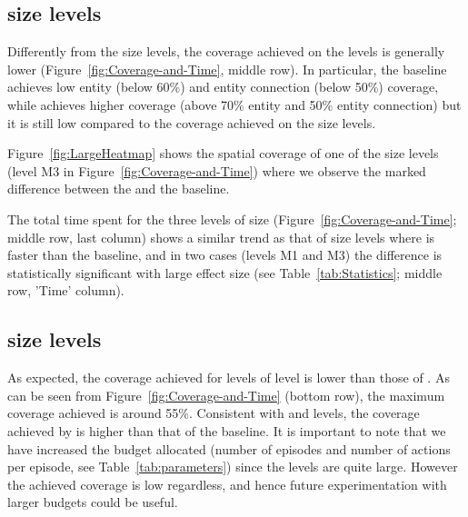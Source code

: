 \subsection{\lrg size levels}
Differently from the \med size levels, the coverage achieved on the \lrg levels is generally lower (Figure~\ref{fig:Coverage-and-Time}, middle row). In particular, the baseline achieves low entity (below 60\%) and entity connection (below 50\%) coverage, while \approach achieves higher coverage (above 70\% entity and 50\% entity connection) but it is still low compared to the coverage achieved on the \med size levels.

Figure~\ref{fig:LargeHeatmap} shows the spatial coverage of one of the \lrg size levels (level M3 in Figure~\ref{fig:Coverage-and-Time}) where we observe the marked difference between the \approach and the baseline.

The total time spent for the three levels of \lrg size (Figure~\ref{fig:Coverage-and-Time}; middle row, last column) shows a similar trend as that of \med size levels where \approach is faster than the baseline, and in two cases (levels M1 and M3) the difference is statistically significant with large effect size (see Table~\ref{tab:Statistics}; middle row, 'Time' column). 

\begin{figure*}[!htb]
	\hspace*{\fill}%
	\hfill%
	\hspace*{\fill}%
	\caption{Spatial coverage for level M3 of \lrg size. The darker the color the less explored the area.}
	\label{fig:LargeHeatmap}
\end{figure*}

\subsection{\ext size levels}
As expected, the coverage achieved for levels of \ext level is lower than those of \med. As can be seen from Figure~\ref{fig:Coverage-and-Time} (bottom row), the maximum coverage achieved is around 55\%. Consistent with \med and \lrg levels, the coverage achieved by \approach is higher than that of the baseline. It is important to note that we have increased the budget allocated (number of episodes and number of actions per episode, see Table~\ref{tab:parameters}) since the levels are quite large. However the achieved coverage is low regardless, and hence future experimentation with larger budgets could be useful.

